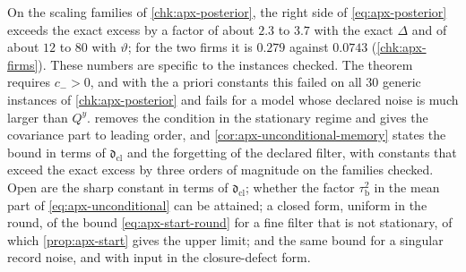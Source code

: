 \begin{openproblem}\label{open:apx-sharp}
On the scaling families of \cref{chk:apx-posterior}, the right side of \cref{eq:apx-posterior} exceeds the exact excess by a factor of about $2.3$ to $3.7$ with the exact $\Delta$ and of about $12$ to $80$ with $\vartheta$; for the two firms it is $0.279$ against $0.0743$ (\cref{chk:apx-firms}). These numbers are specific to the instances checked. The theorem requires $c_->0$, and with the a priori constants this failed on all $30$ generic instances of \cref{chk:apx-posterior} and fails for a model whose declared noise is much larger than $Q^y$.  removes the condition in the stationary regime and gives the covariance part to leading order, and \cref{cor:apx-unconditional-memory} states the bound in terms of $\mathfrak d_{\mathrm{cl}}$ and the forgetting of the declared filter, with constants that exceed the exact excess by three orders of magnitude on the families checked. Open are the sharp constant in terms of $\mathfrak d_{\mathrm{cl}}$; whether the factor $\tau_{\mathrm b}^2$ in the mean part of \cref{eq:apx-unconditional} can be attained; a closed form, uniform in the round, of the bound \eqref{eq:apx-start-round} for a fine filter that is not stationary, of which \cref{prop:apx-start} gives the upper limit; and the same bound for a singular record noise, and with input in the closure-defect form.
\end{openproblem}

